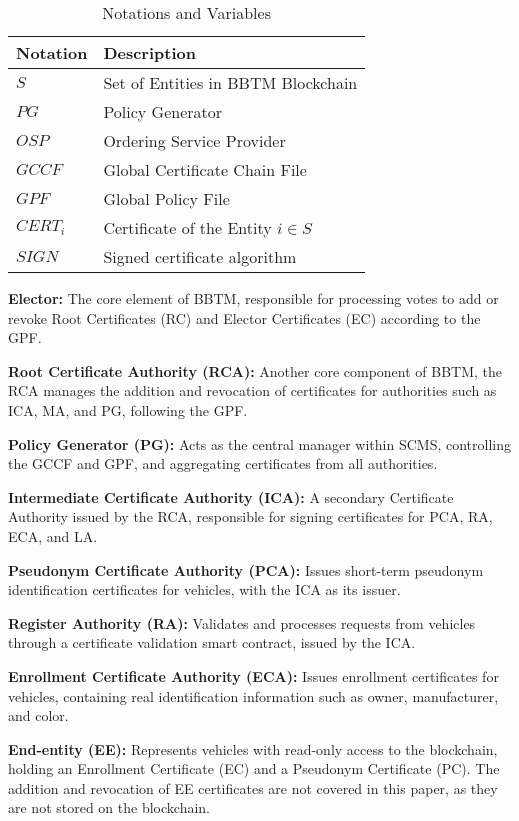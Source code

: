 \begin{table}[t]
\small
\centering
\begin{tabular} { | m{1.2cm}| m{6cm} | }
\hline
\textbf{Notation} & \textbf{Description } \\\hline 
$S$ & Set of Entities in BBTM Blockchain \\\hline 
$PG$ & Policy Generator \\\hline 
$OSP$ & Ordering Service Provider \\\hline
$GCCF$ & Global Certificate Chain File \\\hline
$GPF$ & Global Policy File \\\hline
$CERT_{i}$ & Certificate of the Entity $i \in S$ \\\hline
$SIGN$ & Signed certificate algorithm \\\hline 
\end{tabular}
\caption{Notations and Variables}
\label{table:notations}
\vspace{-5mm}
\end{table}

\textbf{Elector:} The core element of BBTM, responsible for processing votes to add or revoke Root Certificates (RC) and Elector Certificates (EC) according to the GPF.

\textbf{Root Certificate Authority (RCA):} Another core component of BBTM, the RCA manages the addition and revocation of certificates for authorities such as ICA, MA, and PG, following the GPF.

\textbf{Policy Generator (PG):} Acts as the central manager within SCMS, controlling the GCCF and GPF, and aggregating certificates from all authorities.   

\textbf{Intermediate Certificate Authority (ICA):} A secondary Certificate Authority issued by the RCA, responsible for signing certificates for PCA, RA, ECA, and LA.  

\textbf{Pseudonym Certificate Authority (PCA):} Issues short-term pseudonym identification certificates for vehicles, with the ICA as its issuer.

\textbf{Register Authority (RA):} Validates and processes requests from vehicles through a certificate validation smart contract, issued by the ICA.

\textbf{Enrollment Certificate Authority (ECA):} Issues enrollment certificates for vehicles, containing real identification information such as owner, manufacturer, and color.   

\textbf{End-entity (EE):} Represents vehicles with read-only access to the blockchain, holding an Enrollment Certificate (EC) and a Pseudonym Certificate (PC). The addition and revocation of EE certificates are not covered in this paper, as they are not stored on the blockchain.

